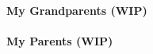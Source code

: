 \documentclass[ twoside,openright,titlepage,numbers=noenddot,headinclude,
                footinclude=true,cleardoublepage=empty,abstractoff,%
                BCOR=5mm,paper=letter,fontsize=11pt,letterpaper,%
                american,%
                ]{scrreprt}
\begin{document}
\paragraph{My Grandparents (WIP)}

\paragraph{My Parents (WIP)}


\cleardoublepage













\printindex

%



\end{document}
